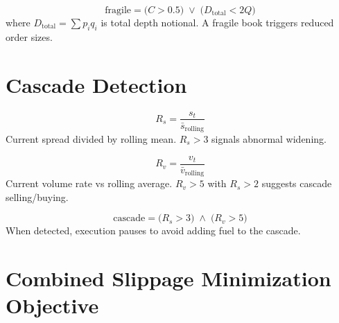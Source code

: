\documentclass[11pt,a4paper]{article}
\begin{document}
\begin{formulabox}[title={\S10.4 — Book Fragility Signal}]
\begin{equation}
  \text{fragile} = \bigl(C > 0.5\bigr) \;\lor\; \bigl(D_{\text{total}} < 2Q\bigr)
\end{equation}
where $D_{\text{total}} = \sum p_i q_i$ is total depth notional. A fragile book triggers reduced order sizes.
\end{formulabox}


\section{Cascade Detection}

\begin{formulabox}[title={\S11.1 — Spread Ratio}]
\begin{equation}
  R_s = \frac{s_t}{\bar{s}_{\text{rolling}}}
\end{equation}
Current spread divided by rolling mean. $R_s > 3$ signals abnormal widening.
\end{formulabox}

\begin{formulabox}[title={\S11.2 — Volume Ratio}]
\begin{equation}
  R_v = \frac{v_t}{\bar{v}_{\text{rolling}}}
\end{equation}
Current volume rate vs rolling average. $R_v > 5$ with $R_s > 2$ suggests cascade selling/buying.
\end{formulabox}

\begin{formulabox}[title={\S11.3 — Cascade Scoring}]
\begin{equation}
  \text{cascade} = \bigl(R_s > 3\bigr) \;\land\; \bigl(R_v > 5\bigr)
\end{equation}
When detected, execution pauses to avoid adding fuel to the cascade.
\end{formulabox}


\section{Combined Slippage Minimization Objective}
\end{document}
